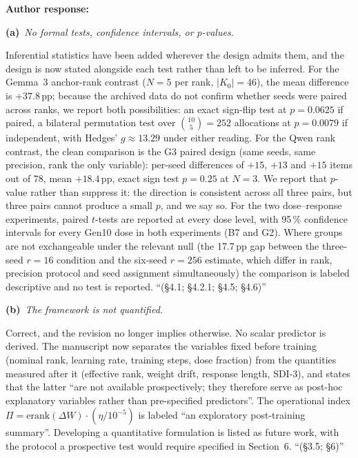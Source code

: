 \documentclass[11pt,a4paper]{article}
\newcommand{\rsub}[2]{%
  \medskip\noindent\textbf{#1}~\textit{#2}\par\smallskip%
}
\newcommand{\arhead}[1]{\medskip\noindent\textbf{#1}\par\smallskip}
\newcommand{\newtext}[1]{\textcolor{chgcolor}{``#1''}}
\begin{document}
\arhead{Author response:}

\rsub{(a)}{No formal tests, confidence intervals, or $p$-values.}
Inferential statistics have been added wherever the design admits them,
and the design is now stated alongside each test rather than left to be
inferred. For the Gemma~3 anchor-rank contrast ($N=5$ per rank,
$|K_0|=46$), the mean difference is $+37.8$\,pp; because the
archived data do not confirm whether seeds were paired across ranks, we
report both possibilities: an exact sign-flip test at $p=0.0625$ if
paired, a bilateral permutation test over $\binom{10}{5}=252$ allocations
at $p=0.0079$ if independent, with Hedges' $g \approx 13.29$ under
either reading. For the Qwen rank contrast, the clean comparison is the
G3 paired design (same seeds, same precision, rank the only variable):
per-seed differences of $+15$, $+13$ and $+15$ items out of 78, mean
$+18.4$\,pp, exact sign test $p=0.25$ at $N=3$. We report that $p$-value
rather than suppress it: the direction is consistent across all three
pairs, but three pairs cannot produce a small $p$, and we say so. For the
two dose--response experiments, paired $t$-tests are reported at every
dose level, with 95\,\% confidence intervals for every Gen10 dose in
both experiments (B7 and G2). Where groups are not
exchangeable under the relevant null (the 17.7\,pp gap between the
three-seed $r=16$ condition and the six-seed $r=256$ estimate, which
differ in rank, precision protocol and seed assignment simultaneously)
the comparison is labeled descriptive and no test is reported.
\newtext{(\S4.1; \S4.2.1; \S4.5; \S4.6)}

\rsub{(b)}{The framework is not quantified.}
Correct, and the revision no longer implies otherwise. No scalar
predictor is derived. The manuscript now separates the variables fixed
before training (nominal rank, learning rate, training steps, dose
fraction) from the quantities measured after it (effective rank,
weight drift, response length, SDI-3), and states that the latter
\newtext{are not available prospectively; they therefore serve as
post-hoc explanatory variables rather than pre-specified predictors}. The
operational index $\Pi = \mathrm{erank}(\Delta W)\cdot(\eta/10^{-5})$ is
labeled \newtext{an exploratory post-training summary}. Developing a
quantitative formulation is listed as future work, with the protocol a
prospective test would require specified in Section~6.
\newtext{(\S3.5; \S6)}
\end{document}
